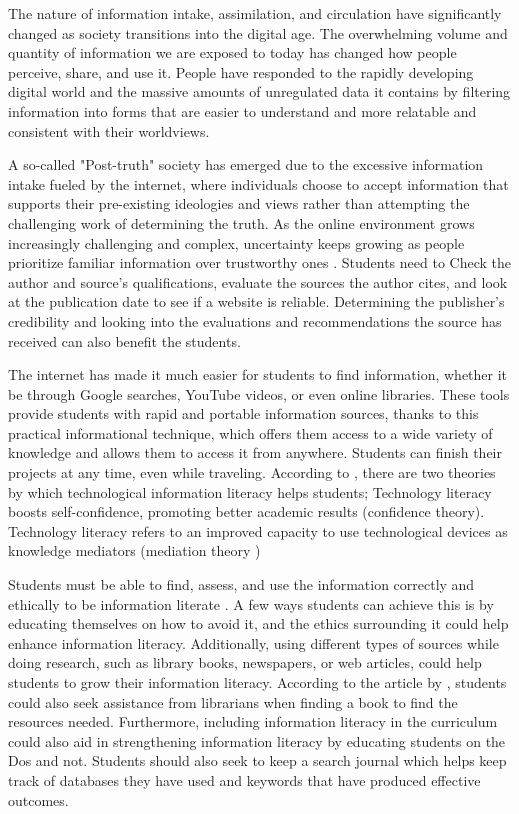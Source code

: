 \documentclass[
    a4paper,
    stu,
    12pt,
   noextraspace,
   floatsintext,
]{APA7}
\begin{document}
The nature of information intake, assimilation, and circulation have significantly changed as society transitions into the digital age. The overwhelming volume and quantity of information we are exposed to today has changed how people perceive, share, and use it. People have responded to the rapidly developing digital world and the massive amounts of unregulated data it contains by filtering information into forms that are easier to understand and more relatable and consistent with their worldviews.

A so-called "Post-truth" society has emerged due to the excessive information intake fueled by the internet, where individuals choose to accept information that supports their pre-existing ideologies and views rather than attempting the challenging work of determining the truth. As the online environment grows increasingly challenging and complex, uncertainty keeps growing as people prioritize familiar information over trustworthy ones \parencite{DEPAOR2020102218}. Students need to  Check the author and source's qualifications, evaluate the sources the author cites, and look at the publication date to see if a website is reliable. Determining the publisher's credibility and looking into the evaluations and recommendations the source has received can also benefit the students.

The internet has made it much easier for students to find information, whether it be through Google searches, YouTube videos, or even online libraries. These tools provide students with rapid and portable information sources, thanks to this practical informational technique, which offers them access to a wide variety of knowledge and allows them to access it from anywhere. Students can finish their projects at any time, even while traveling.  
According to \Textcite{Judson2010}, there are two theories by which technological information literacy helps students; Technology literacy boosts self-confidence, promoting better academic results (confidence theory). Technology literacy refers to an improved capacity to use technological devices as knowledge mediators (mediation theory )

Students must be able to find, assess, and use the information correctly and ethically to be information literate \parencite{loveys2014development}. A few ways students can achieve this is by educating themselves on how to avoid it, and the ethics surrounding it could help enhance information literacy. Additionally, using different types of sources while doing research, such as library books, newspapers, or web articles, could help students to grow their information literacy. According to the article by \Textcite[]{nyarigoti2020assessment}, students could also seek assistance from librarians when finding a book to find the resources needed. Furthermore, including information literacy in the curriculum could also aid in strengthening information literacy by educating students on the Dos and not. Students should also seek to keep a search journal which helps keep track of databases they have used and keywords that have produced effective outcomes.
\end{document}
